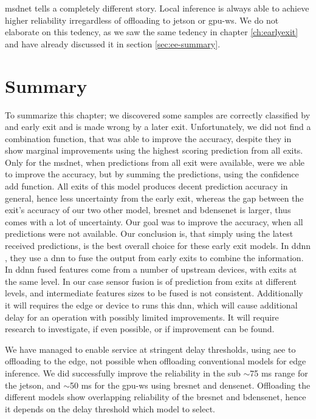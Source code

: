 \gls{msdnet} tells a completely different story. Local inference is always able to achieve higher reliability irregardless of offloading to \gls{jetson} or \gls{gpu-ws}. We do not elaborate on this tedency, as we saw the same tedency in chapter \ref{ch:earlyexit} and have already discussed it in section \ref{sec:ee-summary}.

\section{Summary} \label{sec:edge-summary}

To summarize this chapter; we discovered some samples are correctly classified by and early exit and is made wrong by a later exit. Unfortunately, we did not find a combination function, that was able to improve the accuracy, despite they in \cite{kaya_shallow-deep_nodate} show marginal improvements using the highest scoring prediction from all exits. Only for the \gls{msdnet}, when predictions from all exit were available, were we able to improve the accuracy, but by summing the predictions, using the confidence add function. All exits of this model produces decent prediction accuracy in general, hence less uncertainty from the early exit, whereas the gap between the exit's accuracy of our two other model, \gls{bresnet} and \gls{bdensenet} is larger, thus comes with a lot of uncertainty. Our goal was to improve the accuracy, when all predictions were not available. Our conclusion is, that simply using the latest received predictions, is the best overall choice for these early exit models. In \gls{ddnn} \cite{teerapittayanon_distributed_2017}, they use a \gls{dnn} to fuse the output from early exits to combine the information. In \gls{ddnn} fused features come from a number of upstream devices, with exits at the same level. In our case sensor fusion is of prediction from exits at different levels, and intermediate features sizes to be fused is not consistent. Additionally it will requires the edge or device to runs this \gls{dnn}, which will cause additional delay  for an operation with possibly limited improvements. It will require research to investigate, if even possible, or if improvement can be found.

We have managed to enable service at stringent delay thresholds, using \gls{aee} to offloading to the edge, not possible when offloading conventional models for edge inference. We did successfully improve the reliability in the sub $ \sim $75 ms range for the \gls{jetson}, and $ \sim $50 ms for the \gls{gpu-ws} using \gls{bresnet} and \gls{densenet}. Offloading the different models show overlapping reliability of the \gls{bresnet} and \gls{bdensenet}, hence it depends on the delay threshold which model to select.  

